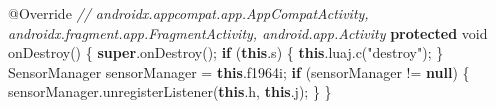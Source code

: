 \documentclass[
]{article}
\newenvironment{Shaded}{}{}
\newcommand{\AttributeTok}[1]{\textcolor[rgb]{0.49,0.56,0.16}{#1}}
\newcommand{\CommentTok}[1]{\textcolor[rgb]{0.38,0.63,0.69}{\textit{#1}}}
\newcommand{\ControlFlowTok}[1]{\textcolor[rgb]{0.00,0.44,0.13}{\textbf{#1}}}
\newcommand{\DataTypeTok}[1]{\textcolor[rgb]{0.56,0.13,0.00}{#1}}
\newcommand{\FunctionTok}[1]{\textcolor[rgb]{0.02,0.16,0.49}{#1}}
\newcommand{\KeywordTok}[1]{\textcolor[rgb]{0.00,0.44,0.13}{\textbf{#1}}}
\newcommand{\NormalTok}[1]{#1}
\newcommand{\OperatorTok}[1]{\textcolor[rgb]{0.40,0.40,0.40}{#1}}
\newcommand{\StringTok}[1]{\textcolor[rgb]{0.25,0.44,0.63}{#1}}
\begin{document}
\begin{Shaded}
\begin{Highlighting}[]
    \AttributeTok{@Override} \CommentTok{// androidx.appcompat.app.AppCompatActivity, androidx.fragment.app.FragmentActivity, android.app.Activity}
    \KeywordTok{protected} \DataTypeTok{void} \FunctionTok{onDestroy}\OperatorTok{()} \OperatorTok{\{}
        \KeywordTok{super}\OperatorTok{.}\FunctionTok{onDestroy}\OperatorTok{();}
        \ControlFlowTok{if} \OperatorTok{(}\KeywordTok{this}\OperatorTok{.}\FunctionTok{s}\OperatorTok{)} \OperatorTok{\{}
            \KeywordTok{this}\OperatorTok{.}\FunctionTok{luaj}\OperatorTok{.}\FunctionTok{c}\OperatorTok{(}\StringTok{"destroy"}\OperatorTok{);}
        \OperatorTok{\}}
\NormalTok{        SensorManager sensorManager }\OperatorTok{=} \KeywordTok{this}\OperatorTok{.}\FunctionTok{f1964i}\OperatorTok{;}
        \ControlFlowTok{if} \OperatorTok{(}\NormalTok{sensorManager }\OperatorTok{!=} \KeywordTok{null}\OperatorTok{)} \OperatorTok{\{}
\NormalTok{            sensorManager}\OperatorTok{.}\FunctionTok{unregisterListener}\OperatorTok{(}\KeywordTok{this}\OperatorTok{.}\FunctionTok{h}\OperatorTok{,} \KeywordTok{this}\OperatorTok{.}\FunctionTok{j}\OperatorTok{);}
        \OperatorTok{\}}
    \OperatorTok{\}}


\end{Highlighting}
\end{Shaded}
\end{document}
